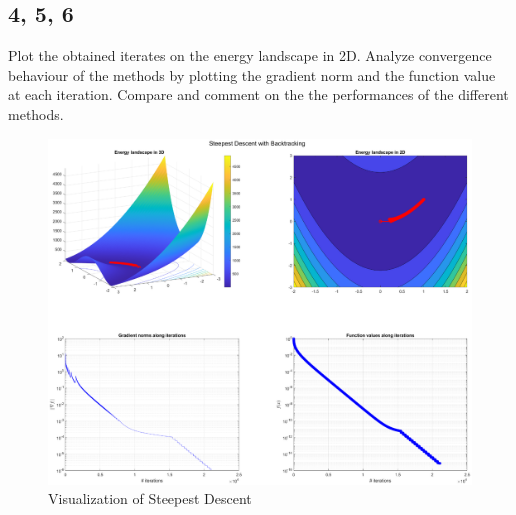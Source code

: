 \documentclass[unicode,11pt,a4paper,oneside,numbers=endperiod,openany]{scrartcl}
\begin{document}
\subsection*{4, 5, 6}
Plot the obtained iterates on the energy landscape in 2D.
Analyze convergence behaviour of the methods by plotting the gradient norm and the function
value at each iteration.
Compare and comment on the the performances of the different methods.
\\\newline
\begin{figure}[H]
    \centering
    \caption{Visualization of Steepest Descent}
    \label{fig:ex1-sd-energy}
    \includegraphics[width=\textwidth, trim={4cm 2.5cm 4cm 1.5cm}, clip]{./figures/ex1-sd-backtracking-energy.eps}
\end{figure}
\end{document}
